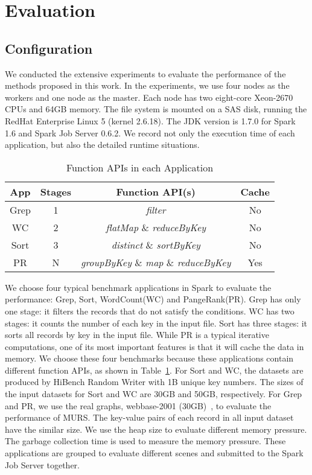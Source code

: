 \section{Evaluation}

\subsection{Configuration}

We conducted the extensive experiments to evaluate the performance of the methods proposed in this work. In the experiments, we use four nodes as the workers and one node as the master. Each node has two eight-core Xeon-2670 CPUs and 64GB memory. The file system is mounted on a SAS disk, running the RedHat Enterprise Linux 5 (kernel 2.6.18). The JDK version is 1.7.0 for Spark 1.6 and Spark Job Server 0.6.2. We record not only the execution time of each application, but also the detailed runtime situations.

\begin{table}[!t]
\small
\centering
\caption{Function APIs in each Application}
\begin{tabular}{ c | c | c | c }

\hline
\textbf{App} & \textbf{Stages} & \textbf{Function API(s)} & \textbf{Cache} \\
\hline
Grep & 1 & \textit{filter} & No \\
\hline
WC & 2 & \textit{flatMap} \& \textit{reduceByKey} & No \\
\hline
Sort & 3 & \textit{distinct} \& \textit{sortByKey} & No \\
\hline
PR & N & \textit{groupByKey} \& \textit{map} \& \textit{reduceByKey} & Yes \\
\hline

\hline
\end{tabular}
\label{table:app}
\end{table} 

We choose four typical benchmark applications in Spark to evaluate the performance: Grep, Sort, WordCount(WC) and PangeRank(PR). Grep has only one stage: it filters the records that do not satisfy the conditions. WC has two stages: it counts the number of each key in the input file. Sort has three stages: it sorts all records by key in the input file. While PR is a typical iterative computations, one of its most important features is that it will cache the data in memory. We choose these four benchmarks because these applications contain different function APIs, as shown in Table~\ref{table:app}. For Sort and WC, the datasets are produced by HiBench Random Writer with 1B unique key numbers. The sizes of the input datasets for Sort and WC are 30GB and 50GB, respectively. For Grep and PR, we use the real graphs, webbase-2001 (30GB)~\cite{boldi:webgraph}, to evaluate the performance of MURS. The key-value pairs of each record in all input dataset have the similar size. We use the heap size to evaluate different memory pressure. The garbage collection time is used to measure the memory pressure. These applications are grouped to evaluate different scenes and submitted to the Spark Job Server together.

